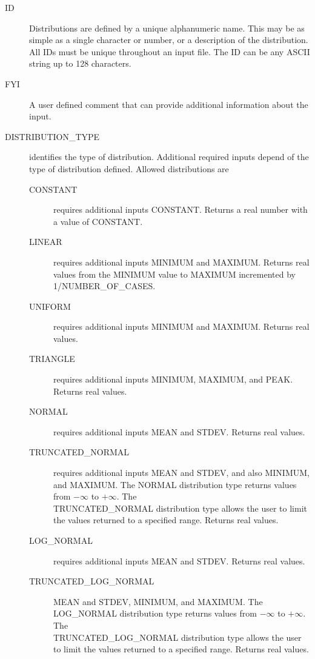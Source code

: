 \documentclass[12pt,twoside]{book}
\begin{document}
\begin{description}
  \item[ID] Distributions are defined by a unique alphanumeric name. This may be as simple as a single character or number, or a description of the distribution. All IDs must be unique throughout an input file. The { \ct ID} can be any ASCII string up to 128 characters.
  \item[FYI] A user defined comment that can provide additional information about the input.
  \item[DISTRIBUTION\_TYPE] identifies the type of distribution. Additional required inputs depend of the type of distribution defined. Allowed distributions are
      \begin{description}
        \item[CONSTANT] requires additional inputs {\ct CONSTANT}. Returns a real number with a value of {\ct CONSTANT}.
        \item[LINEAR] requires additional inputs {\ct MINIMUM} and {\ct MAXIMUM}. Returns real values from the {\ct MINIMUM} value to {\ct MAXIMUM} incremented by 1/{\ct NUMBER\_OF\_CASES}.
        \item[UNIFORM] requires additional inputs {\ct MINIMUM} and {\ct MAXIMUM}. Returns real values.
        \item[TRIANGLE] requires additional inputs {\ct MINIMUM}, {\ct MAXIMUM}, and {\ct PEAK}. Returns real values.
        \item[NORMAL] requires additional inputs {\ct MEAN} and {\ct STDEV}. Returns real values.
        \item[TRUNCATED\_NORMAL] requires additional inputs {\ct MEAN} and {\ct STDEV}, and also {\ct MINIMUM}, and {\ct MAXIMUM}. The {\ct NORMAL} distribution type returns values from $-\infty$ to $+\infty$. The \\
            {\ct TRUNCATED\_NORMAL} distribution type allows the user to limit the values returned to a specified range. Returns real values.
        \item[LOG\_NORMAL] requires additional inputs {\ct MEAN} and {\ct STDEV}. Returns real values.
        \item[TRUNCATED\_LOG\_NORMAL] {\ct MEAN} and {\ct STDEV}, {\ct MINIMUM}, and {\ct MAXIMUM}. The \\
        {\ct LOG\_NORMAL} distribution type returns values from $-\infty$ to $+\infty$. The \\
            {\ct TRUNCATED\_LOG\_NORMAL} distribution type allows the user to limit the values returned to a specified range. Returns real values.

\end{description}
\end{description}
\end{document}
